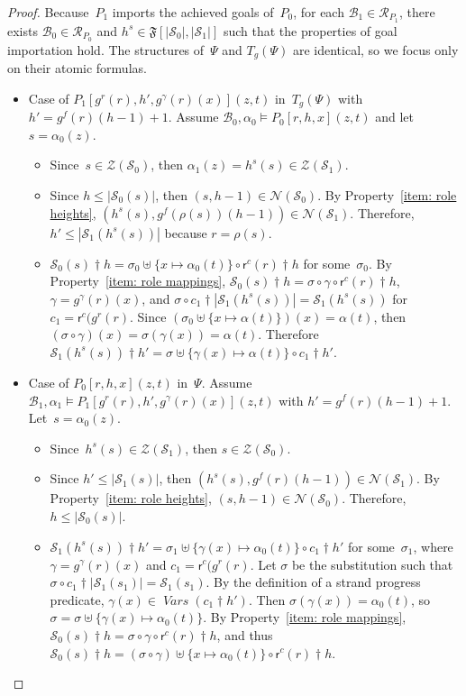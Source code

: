 \documentclass[12pt]{article}
\newcommand{\fn}[1]{\ensuremath{\operatorname{\mathit{#1}}}}
\newcommand{\vars}{\fn{Vars}}
\newcommand{\prefix}[2]{#1\dagger#2}
\newcommand{\alg}[1]{\ensuremath{\mathfrak{#1}}}
\newcommand{\ssp}{\ensuremath{\mathcal{S}}}
\newcommand{\bun}{\ensuremath{\mathcal{B}}}
\newcommand{\strands}{\ensuremath{\mathcal{Z}}}
\newcommand{\nodes}{\ensuremath{\mathcal{N}}}
\newcommand{\run}{\mathcal{R}}
\newcommand{\rl}{\ensuremath{\rho}}
\newcommand{\role}{\mathsf{r}}
\begin{document}
\begin{proof}
Because~$P_1$ imports the achieved goals of~$P_0$, for each
$\bun_1\in\run_{P_1}$, there exists $\bun_0\in\run_{P_0}$ and
$h^s\in\alg{F}[|\ssp_0|, |\ssp_1|]$ such that the properties of goal
importation hold.  The structures of~$\Psi$ and $T_g(\Psi)$ are
identical, so we focus only on their atomic formulas.

\begin{itemize}
\item Case of $P_1[g^r(r),h',g^\gamma(r)(x)](z,t)$ in~$T_g(\Psi)$ with
  $h'=g^f(r)(h-1)+1$.  Assume $\bun_0,\alpha_0\models P_0[r,h,x](z,t)$
  and let~$s=\alpha_0(z)$.
  \begin{itemize}
  \item Since~$s\in\strands(\ssp_0)$, then
    $\alpha_1(z)=h^s(s)\in\strands(\ssp_1)$.
  \item Since $h\leq|\ssp_0(s)|$, then $(s,h-1)\in\nodes(\ssp_0)$.  By
    Property~\ref{item: role heights},
    $(h^s(s),g^f(\rl(s))(h-1))\in\nodes(\ssp_1)$.  Therefore,
    $h'\leq|\ssp_1(h^s(s))|$ because $r=\rl(s)$.
  \item
    $\prefix{\ssp_0(s)}{h}=\sigma_0\uplus\{x\mapsto\alpha_0(t)\}\circ
    \prefix{\role^{c}(r)}{h}$ for some~$\sigma_0$.  By
    Property~\ref{item: role mappings},
    $\prefix{\ssp_0(s)}{h}=\sigma\circ\gamma\circ\prefix{\role^c(r)}{h}$,
    $\gamma=g^\gamma(r)(x)$, and
    $\sigma\circ\prefix{c_1}{|\ssp_1(h^s(s))|}=\ssp_1(h^s(s))$ for
    $c_1=\role^c(g^r(r)$.  Since
    $(\sigma_0\uplus\{x\mapsto\alpha(t)\})(x)=\alpha(t)$, then
    $(\sigma\circ\gamma)(x) =\sigma(\gamma(x))=\alpha(t)$.
    Therefore $\prefix{\ssp_1(h^s(s))}{h'}=\sigma\uplus
    \{\gamma(x)\mapsto\alpha(t)\}\circ \prefix{c_1}{h'}$.
  \end{itemize}

\item Case of $P_0[r,h,x](z,t)$ in~$\Psi$.  Assume $\bun_1,\alpha_1\models
  P_1[g^r(r),h',g^\gamma(r)(x)](z,t)$ with
  $h'=g^f(r)(h-1)+1$.  Let~$s=\alpha_0(z)$.
  \begin{itemize}
  \item Since~$h^s(s)\in\strands(\ssp_1)$, then
    $s\in\strands(\ssp_0)$.
  \item Since $h'\leq|\ssp_1(s)|$, then
    $(h^s(s),g^f(r)(h-1))\in\nodes(\ssp_1)$. By Property~\ref{item:
    role heights}, $(s,h-1)\in\nodes(\ssp_0)$.  Therefore,
    $h\leq|\ssp_0(s)|$.
  \item
    $\prefix{\ssp_1(h^s(s))}{h'}=
    \sigma_1\uplus\{\gamma(x)\mapsto\alpha_0(t)\}\circ
    \prefix{c_1}{h'}$ for some~$\sigma_1$, where
    $\gamma=g^\gamma(r)(x)$ and $c_1=\role^c(g^r(r)$.  Let $\sigma$ be
    the substitution such that
    $\sigma\circ\prefix{c_1}{|\ssp_1(s_1)|}=\ssp_1(s_1)$.  By the
    definition of a strand progress predicate,
    $\gamma(x)\in\vars(\prefix{c_1}{h'})$.  Then
    $\sigma(\gamma(x))=\alpha_0(t)$, so
    $\sigma=\sigma\uplus\{\gamma(x)\mapsto\alpha_0(t)\}$.  By
    Property~\ref{item: role mappings},
    $\prefix{\ssp_0(s)}{h}=\sigma\circ\gamma\circ\prefix{\role^c(r)}{h}$,
    and thus
    $\prefix{\ssp_0(s)}{h}=(\sigma\circ\gamma)\uplus\{x\mapsto\alpha_0(t)\}\circ
    \prefix{\role^{c}(r)}{h}$.
  \end{itemize}


\end{itemize}
\end{proof}
\end{document}
